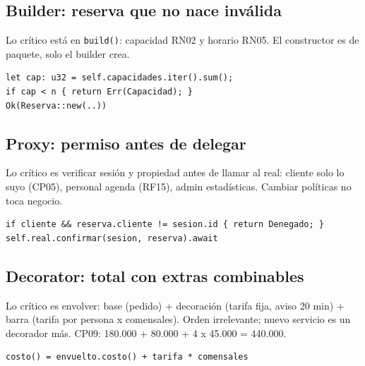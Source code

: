 \documentclass[12pt]{article}
\begin{document}
\subsection{Builder: reserva que no nace inv{\'a}lida}
Lo cr{\'i}tico est{\'a} en \texttt{build()}: capacidad RN02 y horario RN05. El constructor es de paquete, solo el builder crea.
\begin{lstlisting}
let cap: u32 = self.capacidades.iter().sum();
if cap < n { return Err(Capacidad); }
Ok(Reserva::new(..))
\end{lstlisting}
\subsection{Proxy: permiso antes de delegar}
Lo cr{\'i}tico es verificar sesi{\'o}n y propiedad antes de llamar al real: cliente solo lo suyo (CP05), personal agenda (RF15), admin estad{\'i}sticas. Cambiar pol{\'i}ticas no toca negocio.
\begin{lstlisting}
if cliente && reserva.cliente != sesion.id { return Denegado; }
self.real.confirmar(sesion, reserva).await
\end{lstlisting}
\subsection{Decorator: total con extras combinables}
Lo cr{\'i}tico es envolver: base (pedido) + decoraci{\'o}n (tarifa fija, aviso 20 min) + barra (tarifa por persona x comensales). Orden irrelevante; nuevo servicio es un decorador m{\'a}s. CP09: 180.000 + 80.000 + 4 x 45.000 = 440.000.
\begin{lstlisting}
costo() = envuelto.costo() + tarifa * comensales
\end{lstlisting}
\end{document}
